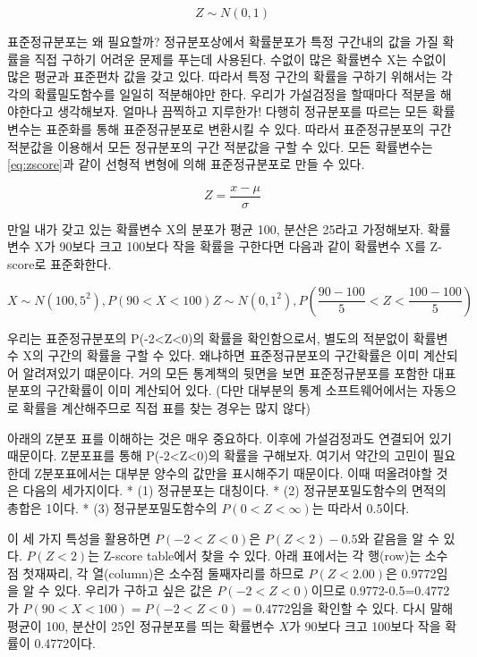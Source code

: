 \documentclass[
]{book}
\begin{document}
\begin{equation}
Z\sim N(0,1)
\label{eq:stno}
\end{equation}

표준정규분포는 왜 필요할까? 정규분포상에서 확률분포가 특정 구간내의 값을 가질 확률을 직접 구하기 어려운 문제를 푸는데 사용된다. 수없이 많은 확률변수 X는 수없이 많은 평균과 표준편차 값을 갖고 있다. 따라서 특정 구간의 확률을 구하기 위해서는 각각의 확률밀도함수를 일일히 적분해야만 한다. 우리가 가설검정을 할때마다 적분을 해야한다고 생각해보자. 얼마나 끔찍하고 지루한가!
다행히 정규분포를 따르는 모든 확률변수는 표준화를 통해 표준정규분포로 변환시킬 수 있다. 따라서 표준정규분포의 구간 적분값을 이용해서 모든 정규분포의 구간 적분값을 구할 수 있다.
모든 확률변수는 \eqref{eq:zscore}과 같이 선형적 변형에 의해 표준정규분포로 만들 수 있다.

\begin{equation}
Z=\frac{x-\mu}{\sigma}
\label{eq:zscore}
\end{equation}

만일 내가 갖고 있는 확률변수 X의 분포가 평균 100, 분산은 25라고 가정해보자. 확률변수 X가 90보다 크고 100보다 작을 확률을 구한다면 다음과 같이 확률변수 X를 Z-score로 표준화한다.

\begin{equation}
X\sim N(100, 5^{2}), P(90<X<100)
Z\sim N(0, 1^{2}), P(\frac{90-100}{5}<Z<\frac{100-100}{5})
\label{eq:zca}
\end{equation}

우리는 표준정규분포의 P(-2\textless Z\textless0)의 확률을 확인함으로서, 별도의 적분없이 확률변수 X의 구간의 확률을 구할 수 있다. 왜냐하면 표준정규분포의 구간확률은 이미 계산되어 알려져있기 떄문이다. 거의 모든 통계책의 뒷면을 보면 표준정규분포를 포함한 대표분포의 구간확률이 이미 계산되어 있다. (다만 대부분의 통계 소프트웨어에서는 자동으로 확률을 계산해주므로 직접 표를 찾는 경우는 많지 않다)

아래의 Z분포 표를 이해하는 것은 매우 중요하다. 이후에 가설검정과도 연결되어 있기 때문이다. Z분포표를 통해 P(-2\textless Z\textless0)의 확률을 구해보자. 여기서 약간의 고민이 필요한데 Z분포표에서는 대부분 양수의 값만을 표시해주기 때문이다. 이때 떠올려야할 것은 다음의 세가지이다.
* (1) 정규분포는 대칭이다.
* (2) 정규분포밀도함수의 면적의 총합은 1이다.
* (3) 정규분포밀도함수의 \(P(0<Z<\infty)\)는 따라서 0.5이다.

이 세 가지 특성을 활용하면 \(P(−2<Z<0)\)은 \(P(Z<2)−0.5\)와 같음을 알 수 있다. \(P(Z<2)\)는 Z-score table에서 찾을 수 있다.
아래 표에서는 각 행(row)는 소수점 첫재짜리, 각 열(column)은 소수점 둘째자리를 하므로 \(P(Z<2.00)\)은 0.9772임을 알 수 있다. 우리가 구하고 싶은 값은 \(P(-2<Z<0)\)이므로 0.9772-0.5=0.4772가 \(P(90<X<100) = P(-2<Z<0)=0.4772\)임을 확인할 수 있다. 다시 말해 평균이 100, 분산이 25인 정규분포를 띄는 확률변수 \(X\)가 90보다 크고 100보다 작을 확률이 0.4772이다.
\end{document}
